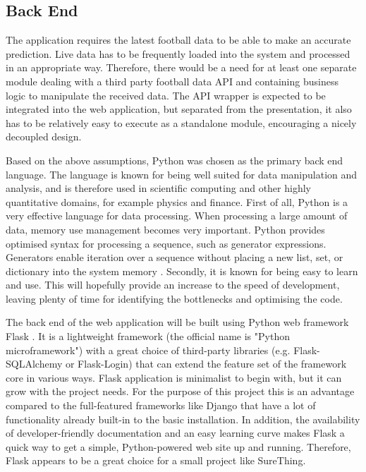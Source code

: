 \subsection{Back End}
\label{subsec:backend}
The application requires the latest football data to be able to make an accurate prediction. Live data has to be frequently loaded into the system and processed in an appropriate way. Therefore, there would be a need for at least one separate module dealing with a third party football data API and containing business logic to manipulate the received data. The API wrapper is expected to be integrated into the web application, but separated from the presentation, it also has to be relatively easy to execute as a standalone module, encouraging a nicely decoupled design. 

Based on the above assumptions, Python was chosen as the primary back end language. The language is known for being well suited for data manipulation and analysis, and is therefore used in scientific computing and other highly quantitative domains, for example physics and finance. First of all, Python is a very effective language for data processing. When processing a large amount of data, memory use management becomes very important. Python provides optimised syntax for processing a sequence, such as generator expressions. Generators enable iteration over a sequence without placing a new list, set, or dictionary into the system memory \citep{book:Phillips2010Python3ObjectOrientedProgramming}. Secondly, it is known for being easy to learn and use. This will hopefully provide an increase to the speed of development, leaving plenty of time for identifying the bottlenecks and optimising the code. 

The back end of the web application will be built using Python web framework Flask \citep{documentation:Flask}. It is a lightweight framework (the official name is "Python microframework") with a great choice of third-party libraries (e.g. Flask-SQLAlchemy or Flask-Login) that can extend the feature set of the framework core in various ways. Flask application is minimalist to begin with, but it can grow with the project needs. For the purpose of this project this is an advantage compared to the full-featured frameworks like Django that have a lot of functionality already built-in to the basic installation. In addition, the availability of developer-friendly documentation and an easy learning curve makes Flask a quick way to get a simple, Python-powered web site up and running. Therefore, Flask appears to be a great choice for a small project like SureThing.

